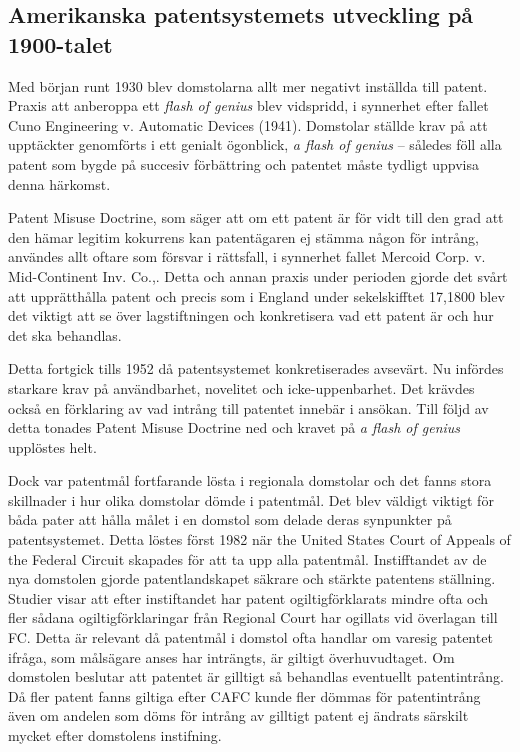 \subsection{Amerikanska patentsystemets utveckling på 1900-talet}

Med början runt 1930 blev domstolarna allt mer negativt inställda till
patent\cite{bracha}. Praxis att anberoppa ett \emph{flash of genius} blev vidspridd, i synnerhet efter fallet Cuno
Engineering v. Automatic Devices (1941). Domstolar ställde krav på att upptäckter genomförts i ett
genialt ögonblick, \emph{a flash of genius} -- således föll alla patent som bygde på succesiv förbättring och patentet måste tydligt uppvisa denna härkomst\cite{nard}. 

Patent Misuse Doctrine, som säger att om ett patent är för vidt till den grad att den hämar legitim
kokurrens kan patentägaren ej stämma någon för intrång, användes allt oftare som försvar i rättsfall, i
synnerhet fallet Mercoid Corp. v. Mid-Continent Inv. Co.,\cite{nard}. Detta och annan praxis under
perioden gjorde det svårt att upprätthålla patent och precis som i England under sekelskifftet 17,1800
blev det viktigt att se över lagstiftningen och konkretisera vad ett patent är och hur det ska behandlas.


Detta fortgick tills 1952 då patentsystemet konkretiserades avsevärt. Nu infördes
starkare krav på användbarhet, novelitet och icke-uppenbarhet. Det krävdes också en förklaring av vad
intrång till patentet innebär i ansökan. Till följd av detta tonades Patent Misuse Doctrine ned och
kravet på \emph{a flash of genius} upplöstes helt\cite{nard}.

Dock var patentmål fortfarande lösta i regionala domstolar och det fanns stora skillnader i hur olika
domstolar dömde i patentmål\cite{nard}. Det blev väldigt viktigt för båda pater att hålla målet i en
domstol som delade deras synpunkter på patentsystemet. Detta löstes först 1982 när the United States
Court of Appeals of the Federal Circuit skapades för att ta upp alla patentmål\cite{nard}. Instifftandet
av de nya domstolen gjorde patentlandskapet säkrare och stärkte patentens ställning. Studier visar att
efter instiftandet har patent ogiltigförklarats mindre ofta och fler sådana ogiltigförklaringar från
Regional Court har ogillats vid överlagan till FC. \cite{henry} Detta är relevant då patentmål i domstol
ofta handlar om varesig patentet ifråga, som målsägare anses har inträngts, är giltigt överhuvudtaget.
Om domstolen beslutar att patentet är gilltigt så behandlas eventuellt patentintrång. Då fler patent
fanns giltiga efter CAFC kunde fler dömmas för patentintrång även om andelen som döms för intrång av
gilltigt patent ej ändrats särskilt mycket efter domstolens instifning. 

